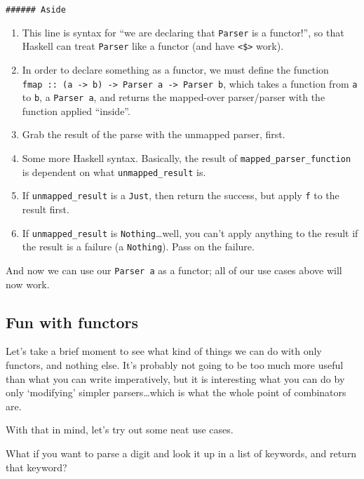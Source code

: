 \documentclass[]{article}
\begin{document}
\begin{verbatim}
###### Aside
\end{verbatim}

\begin{enumerate}
\def\labelenumi{\arabic{enumi}.}
\tightlist
\item
  This line is syntax for ``we are declaring that \texttt{Parser} is a functor!'', so that Haskell
  can treat \texttt{Parser} like a functor (and have \texttt{\textless{}\$\textgreater{}} work).
\item
  In order to declare something as a functor, we must define the function
  \texttt{fmap\ ::\ (a\ -\textgreater{}\ b)\ -\textgreater{}\ Parser\ a\ -\textgreater{}\ Parser\ b},
  which takes a function from \texttt{a} to \texttt{b}, a \texttt{Parser\ a}, and returns the
  mapped-over parser/parser with the function applied ``inside''.
\item
  Grab the result of the parse with the unmapped parser, first.
\item
  Some more Haskell syntax. Basically, the result of \texttt{mapped\_parser\_function} is dependent
  on what \texttt{unmapped\_result} is.
\item
  If \texttt{unmapped\_result} is a \texttt{Just}, then return the success, but apply \texttt{f} to
  the result first.
\item
  If \texttt{unmapped\_result} is \texttt{Nothing}\ldots{}well, you can't apply anything to the
  result if the result is a failure (a \texttt{Nothing}). Pass on the failure.
\end{enumerate}

And now we can use our \texttt{Parser\ a} as a functor; all of our use cases above will now work.

\subsection{Fun with functors}\label{fun-with-functors}

Let's take a brief moment to see what kind of things we can do with only functors, and nothing else.
It's probably not going to be too much more useful than what you can write imperatively, but it is
interesting what you can do by only `modifying' simpler parsers\ldots{}which is what the whole point
of combinators are.

With that in mind, let's try out some neat use cases.

What if you want to parse a digit and look it up in a list of keywords, and return that keyword?
\end{document}
